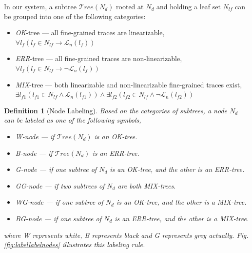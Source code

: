 \documentclass[runningheads]{llncs}
\newtheorem{myDef}{Definition}
\begin{document}
In our system, a subtree $\mathcal{T}ree(N_{d})$ rooted at $N_d$ and holding a leaf set $N_{lf}$ can be grouped into one of the following categories:
\begin{itemize}
  \item \textit{OK}-tree --- all fine-grained traces are linearizable,\\
  $\forall l_f \left( l_f\in N_{lf} \rightarrow \mathcal{L}_n(l_f)\right)$
  \item \textit{ERR}-tree --- all fine-grained traces are non-linearizable,\\
  $\forall l_f \left(  l_f\in N_{lf} \rightarrow \neg \mathcal{L}_n(l_f)\right)$
  \item \textit{MIX}-tree --- both linearizable and non-linearizable fine-grained traces exist,\\
  $\exists l_{f1} ( l_{f1}\in N_{lf} \wedge \mathcal{L}_n(l_{f1})) \wedge  \exists l_{f2} (l_{f2}\in N_{lf} \wedge \neg \mathcal{L}_n(l_{f2}))$

\end{itemize}

\begin{myDef}[Node Labeling]\label{def:nodelabel}
Based on the categories of subtrees, a node $N_d$ can be labeled as one of the following symbols,
\begin{itemize}
  \item \textit{W}-node --- if $\mathcal{T}ree(N_d)$ is an \textit{OK}-tree.
  \item \textit{B}-node --- if $\mathcal{T}ree(N_d)$ is an \textit{ERR}-tree.
  \item \textit{G}-node --- if one subtree of $N_d$ is an \textit{OK}-tree, and the other is an \textit{ERR}-tree.
  \item \textit{GG}-node --- if two subtrees of $N_d$ are both \textit{MIX}-trees.
  \item \textit{WG}-node --- if one subtree of $N_d$ is an \textit{OK}-tree, and the other is a \textit{MIX}-tree.
  \item \textit{BG}-node --- if one subtree of $N_d$ is an \textit{ERR}-tree, and the other is a \textit{MIX}-tree.
\end{itemize}
\noindent where \textit{W} represents \textit{white}, \textit{B} represents \textit{black} and \textit{G} represents \textit{grey} actually. Fig. \ref{fig:labellabelnodes} illustrates this labeling rule.
\end{myDef}
\end{document}
